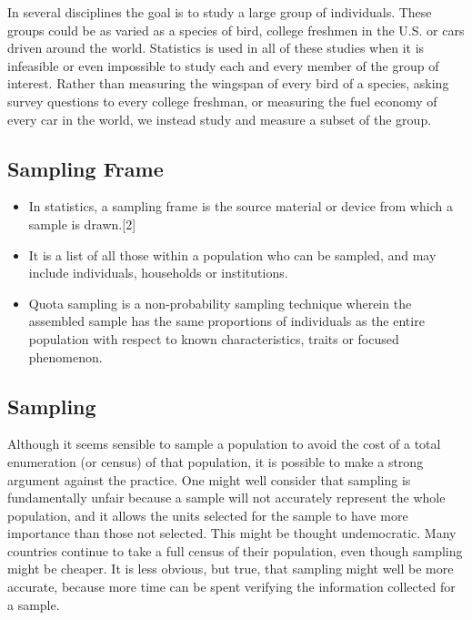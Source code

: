 ﻿\documentclass[]{report}
\begin{document}
In several disciplines the goal is to study a large group of individuals. These groups could be as varied as a species of bird, college freshmen in the U.S. or cars driven around the world. Statistics is used in all of these studies when it is infeasible or even impossible to study each and every member of the group of interest. Rather than measuring the wingspan of every bird of a species, asking survey questions to every college freshman, or measuring the fuel economy of every car in the world, we instead study and measure a subset of the group.



\subsection{Sampling Frame}
\begin{itemize}
\item In statistics, a sampling frame is the source material or device from which a sample is drawn.[2] 
\item It is a list of all those within a population who can be sampled, and may include individuals, households or institutions.


\item Quota sampling is a non-probability sampling technique wherein the assembled sample has the same proportions of individuals as the entire population with respect to known characteristics, traits or focused phenomenon.
\end{itemize}





\subsection{Sampling}
Although it seems sensible to sample a population to avoid the cost of a total enumeration (or
census) of that population, it is possible to make a strong argument against the practice. One might
well consider that sampling is fundamentally unfair because a sample will not accurately represent
the whole population, and it allows the units selected for the sample to have more importance
than those not selected. This might be thought undemocratic. Many countries continue to take
a full census of their population, even though sampling might be cheaper. It is less obvious, but
true, that sampling might well be more accurate, because more time can be spent verifying the
information collected for a sample.
\end{document}
